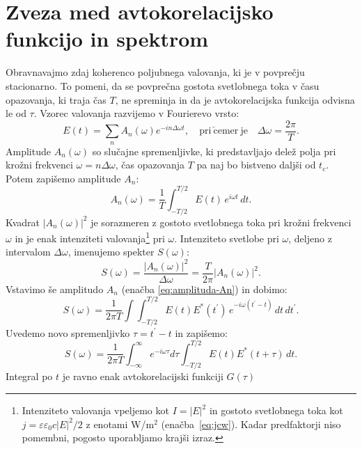 \section{Zveza med avtokorelacijsko funkcijo in spektrom}

Obravnavajmo zdaj koherenco poljubnega valovanja, ki
je v povprečju stacionarno. To pomeni, da se povprečna gostota svetlobnega
toka v času opazovanja, ki traja čas $T$, ne spreminja in da je avtokorelacijska funkcija
odvisna le od $\tau$. Vzorec valovanja razvijemo
v Fourierevo vrsto:
\begin{equation}
E(t)=\sum_{n}A_{n}(\omega)e^{-i n \Delta\omega t},\quad\mathrm{pri~\check{c}emer~je} \quad \Delta\omega=\frac{2\pi}{T}.
\end{equation}
Amplitude $A_{n}(\omega)$ so slučajne spremenljivke, ki predstavljajo delež polja pri 
krožni frekvenci $\omega=n\Delta\omega$, čas opazovanja $T$ pa naj bo bistveno daljši od $t_{c}$. 
Potem zapišemo amplitude $A_n$:
\begin{equation}
A_{n}(\omega)=\frac{1}{T}\int_{-T/2}^{T/2}E(t)\, e^{i\omega t}\, dt.\label{eq:amplituda-An}
\end{equation}
Kvadrat $|A_{n}(\omega)|^{2}$ je sorazmeren z gostoto svetlobnega toka pri krožni
frekvenci $\omega$ in je enak intenziteti
valovanja\footnote{Intenziteto valovanja vpeljemo kot $I = |E|^2$ in gostoto svetlobnega
toka kot $j = \varepsilon \varepsilon_0 c |E|^2/2$ z enotami W/m$^2$ (enačba~\ref{eq:jcw}). 
Kadar predfaktorji niso pomembni, pogosto uporabljamo krajši izraz.}  pri $\omega$. 
Intenziteto svetlobe pri $\omega$, deljeno z intervalom $\Delta\omega$, imenujemo  
spekter $S(\omega)$:
\begin{equation}
S(\omega)=\frac{|A_{n}(\omega)|^{2}}{\Delta\omega}=\frac{T}{2\pi}|A_{n}(\omega)|^{2}.
\end{equation}
Vstavimo še amplitudo $A_{n}$ (enačba \ref{eq:amplituda-An}) in dobimo:
\begin{equation}
S(\omega) =\frac{1}{2\pi T}\int\int_{-T/2}^{T/2}E(t)E^{*}(t^{\prime})\, 
e^{-i\omega(t^{\prime}-t)}\, dt\, dt^{\prime}.
\end{equation}
Uvedemo novo spremenljivko $\tau=t^{\prime}-t$ in zapišemo:
\begin{equation}
S(\omega)=\frac{1}{2\pi T}\int_{-\infty}^{\infty}e^{-i\omega\tau}d\tau\int_{-T/2}^{T/2}E(t)E^{*}(t+\tau)\, dt.
\label{eq:spekter}
\end{equation}
Integral po $t$ je ravno enak avtokorelacijski funkciji $G(\tau)$ 
